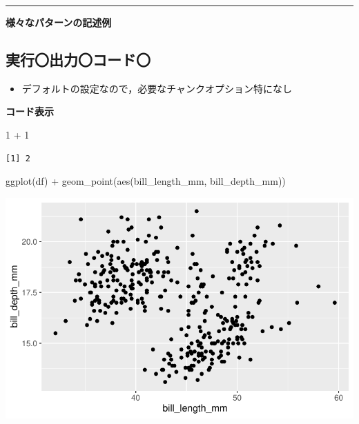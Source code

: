 \documentclass[
  b5paper,
  xelatex, ja=standard]{bxjsbook}
\newenvironment{Shaded}{\begin{snugshade}}{\end{snugshade}}
\newcommand{\DecValTok}[1]{\textcolor[rgb]{0.68,0.00,0.00}{#1}}
\newcommand{\FunctionTok}[1]{\textcolor[rgb]{0.28,0.35,0.67}{#1}}
\newcommand{\NormalTok}[1]{\textcolor[rgb]{0.00,0.23,0.31}{#1}}
\newcommand{\SpecialCharTok}[1]{\textcolor[rgb]{0.37,0.37,0.37}{#1}}
\providecommand{\tightlist}{%
  \setlength{\itemsep}{0pt}\setlength{\parskip}{0pt}}\usepackage{longtable,booktabs,array}
\begin{document}
\begin{center}\rule{0.5\linewidth}{0.5pt}\end{center}

\textbf{様々なパターンの記述例}

\subsection{実行〇\textbar 出力〇\textbar コード〇}

\begin{itemize}
\tightlist
\item
  デフォルトの設定なので，必要なチャンクオプション特になし
\end{itemize}

\textbf{コード表示}

\begin{Shaded}
\begin{Highlighting}[]
\DecValTok{1} \SpecialCharTok{+} \DecValTok{1}
\end{Highlighting}
\end{Shaded}

\begin{verbatim}
[1] 2
\end{verbatim}

\begin{Shaded}
\begin{Highlighting}[]
\FunctionTok{ggplot}\NormalTok{(df) }\SpecialCharTok{+}
  \FunctionTok{geom\_point}\NormalTok{(}\FunctionTok{aes}\NormalTok{(bill\_length\_mm, bill\_depth\_mm))}
\end{Highlighting}
\end{Shaded}

\includegraphics{basic_files/figure-pdf/unnamed-chunk-3-1.pdf}
\end{document}
